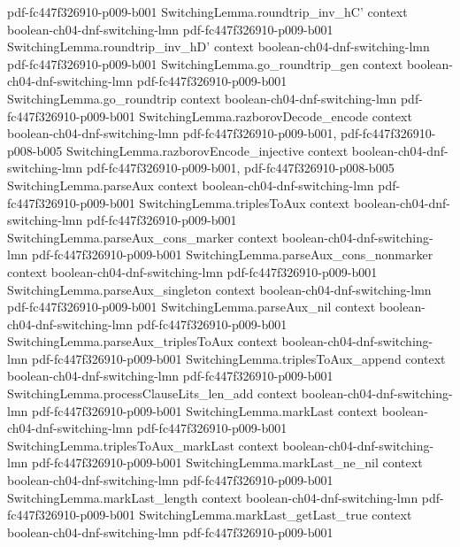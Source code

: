 \begin{theorem}
  {pdf-fc447f326910-p009-b001}
\proofstep
  {SwitchingLemma.roundtrip_inv_hC'}
  {context}
  {boolean-ch04-dnf-switching-lmn}
  {pdf-fc447f326910-p009-b001}
\proofstep
  {SwitchingLemma.roundtrip_inv_hD'}
  {context}
  {boolean-ch04-dnf-switching-lmn}
  {pdf-fc447f326910-p009-b001}
\proofstep
  {SwitchingLemma.go_roundtrip_gen}
  {context}
  {boolean-ch04-dnf-switching-lmn}
  {pdf-fc447f326910-p009-b001}
\proofstep
  {SwitchingLemma.go_roundtrip}
  {context}
  {boolean-ch04-dnf-switching-lmn}
  {pdf-fc447f326910-p009-b001}
\proofstep
  {SwitchingLemma.razborovDecode_encode}
  {context}
  {boolean-ch04-dnf-switching-lmn}
  {pdf-fc447f326910-p009-b001,
    pdf-fc447f326910-p008-b005}
\proofstep
  {SwitchingLemma.razborovEncode_injective}
  {context}
  {boolean-ch04-dnf-switching-lmn}
  {pdf-fc447f326910-p009-b001,
    pdf-fc447f326910-p008-b005}
\proofstep
  {SwitchingLemma.parseAux}
  {context}
  {boolean-ch04-dnf-switching-lmn}
  {pdf-fc447f326910-p009-b001}
\proofstep
  {SwitchingLemma.triplesToAux}
  {context}
  {boolean-ch04-dnf-switching-lmn}
  {pdf-fc447f326910-p009-b001}
\proofstep
  {SwitchingLemma.parseAux_cons_marker}
  {context}
  {boolean-ch04-dnf-switching-lmn}
  {pdf-fc447f326910-p009-b001}
\proofstep
  {SwitchingLemma.parseAux_cons_nonmarker}
  {context}
  {boolean-ch04-dnf-switching-lmn}
  {pdf-fc447f326910-p009-b001}
\proofstep
  {SwitchingLemma.parseAux_singleton}
  {context}
  {boolean-ch04-dnf-switching-lmn}
  {pdf-fc447f326910-p009-b001}
\proofstep
  {SwitchingLemma.parseAux_nil}
  {context}
  {boolean-ch04-dnf-switching-lmn}
  {pdf-fc447f326910-p009-b001}
\proofstep
  {SwitchingLemma.parseAux_triplesToAux}
  {context}
  {boolean-ch04-dnf-switching-lmn}
  {pdf-fc447f326910-p009-b001}
\proofstep
  {SwitchingLemma.triplesToAux_append}
  {context}
  {boolean-ch04-dnf-switching-lmn}
  {pdf-fc447f326910-p009-b001}
\proofstep
  {SwitchingLemma.processClauseLits_len_add}
  {context}
  {boolean-ch04-dnf-switching-lmn}
  {pdf-fc447f326910-p009-b001}
\proofstep
  {SwitchingLemma.markLast}
  {context}
  {boolean-ch04-dnf-switching-lmn}
  {pdf-fc447f326910-p009-b001}
\proofstep
  {SwitchingLemma.triplesToAux_markLast}
  {context}
  {boolean-ch04-dnf-switching-lmn}
  {pdf-fc447f326910-p009-b001}
\proofstep
  {SwitchingLemma.markLast_ne_nil}
  {context}
  {boolean-ch04-dnf-switching-lmn}
  {pdf-fc447f326910-p009-b001}
\proofstep
  {SwitchingLemma.markLast_length}
  {context}
  {boolean-ch04-dnf-switching-lmn}
  {pdf-fc447f326910-p009-b001}
\proofstep
  {SwitchingLemma.markLast_getLast_true}
  {context}
  {boolean-ch04-dnf-switching-lmn}
  {pdf-fc447f326910-p009-b001}

\end{theorem}
